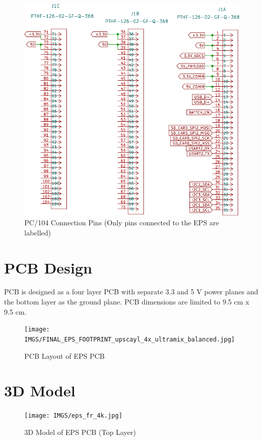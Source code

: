    \begin{figure}[H]
 	\centering
 	\includegraphics[width=0.99\columnwidth]{FrontMatter/pcb.pdf}
 	\caption{\centering PC/104 Connection Pins (Only pins connected to the EPS are labelled)}
 	\label{fig:pc104 4lr}
 \end{figure}
 
 \section{PCB Design}
 PCB is designed as a four layer PCB with separate 3.3 and 5 V power planes and the bottom layer as the ground plane. PCB dimensions are limited to 9.5 cm x 9.5 cm.
 
 
  \begin{figure}[H]
 	\centering
 	\texttt{[image: IMGS/FINAL\_EPS\_FOOTPRINT\_upscayl\_4x\_ultramix\_balanced.jpg]}
 	\caption{\centering PCB Layout of EPS PCB}
 	\label{fig:epsfp}
 \end{figure}
 
\section{3D Model}

 
 \begin{figure}[H]
 	\centering
 	\texttt{[image: IMGS/eps\_fr\_4k.jpg]}
 	\caption{\centering 3D Model of EPS PCB (Top Layer)}
 	\label{fig:eps3dfr}
 \end{figure}
 
